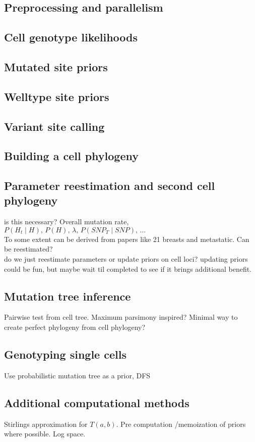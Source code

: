 \documentclass[../main.tex]{subfiles}
\begin{document}


\subsection{Preprocessing and parallelism}


\subsection{Cell genotype likelihoods}


\subsection{Mutated site priors}


\subsection{Welltype site priors}


\subsection{Variant site calling}


\subsection{Building a cell phylogeny}


\subsection{Parameter reestimation and second cell phylogeny}
is this necessary? Overall mutation rate, $P(H_t\mid H),\,P(H),\,\lambda,\,P(SNP_T\mid SNP),\,\dots$\\
To some extent can be derived from papers like 21 breasts and metastatic. Can be reestimated?\\
do we just reestimate parameters or update priors on cell loci? updating priors could be fun, but maybe wait til completed to see if it brings additional benefit.\\

\subsection{Mutation tree inference}
Pairwise test from cell tree. Maximum parsimony inspired? Minimal way to create perfect phylogeny from cell phylogeny?
\subsection{Genotyping single cells}
Use probabilistic mutation tree as a prior, DFS
\subsection{Additional computational methods}
Stirlings approximation for $T(a,b)$. Pre computation /memoization of priors where possible. Log space.
\end{document}
